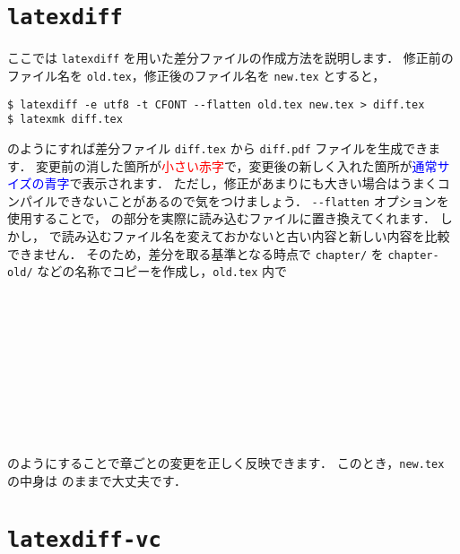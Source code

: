 \section{\texttt{latexdiff}}
\label{sec:latexdiff}

ここでは \verb|latexdiff| を用いた差分ファイルの作成方法を説明します．
修正前のファイル名を \verb|old.tex|，修正後のファイル名を \verb|new.tex| とすると，
\begin{tcolorbox}[title={\texttt{latexdiff} を使用した差分ファイルの生成方法}]
\begin{verbatim}
$ latexdiff -e utf8 -t CFONT --flatten old.tex new.tex > diff.tex
$ latexmk diff.tex
\end{verbatim}
\end{tcolorbox}
\noindent
のようにすれば差分ファイル \verb|diff.tex| から \verb|diff.pdf| ファイルを生成できます．
変更前の消した箇所が\textcolor{red}{\scriptsize 小さい赤字}で，変更後の新しく入れた箇所が\textcolor{blue}{\sffamily 通常サイズの青字}で表示されます．
ただし，修正があまりにも大きい場合はうまくコンパイルできないことがあるので気をつけましょう．
\verb|--flatten| オプションを使用することで，\verb|| の部分を実際に読み込むファイルに置き換えてくれます．
しかし，\verb|| で読み込むファイル名を変えておかないと古い内容と新しい内容を比較できません．
そのため，差分を取る基準となる時点で \verb|chapter/| を \verb|chapter-old/| などの名称でコピーを作成し，\verb|old.tex| 内で
\begin{verbatim}











\end{verbatim}
のようにすることで章ごとの変更を正しく反映できます．
このとき，\verb|new.tex| の中身は \verb|| のままで大丈夫です．

\section{\texttt{latexdiff-vc}}
\label{sec:latexdiff-vc}

